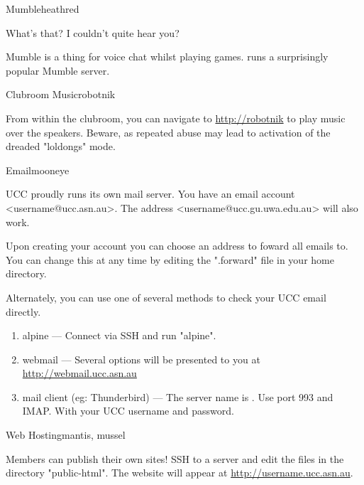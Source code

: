 \begin{uccservice}{Mumble}{heathred}

What's that? I couldn't quite hear you?

Mumble is a thing for voice chat whilst playing games.  runs a surprisingly popular Mumble server.

\end{uccservice}

\begin{uccservice}{Clubroom Music}{robotnik}

From within the clubroom, you can navigate to \url{http://robotnik} to play music over the speakers. Beware, as repeated abuse may lead to activation of the dreaded "loldongs" mode.

\end{uccservice}
\pagebreak
\begin{uccservice}{Email}{mooneye}

UCC proudly runs its own mail server. You have an email account <username@ucc.asn.au>. The address <username@ucc.gu.uwa.edu.au> will also work.

Upon creating your account you can choose an address to foward all emails to. You can change this at any time by editing the ".forward" file in your home directory.

Alternately, you can use one of several methods to check your UCC email directly.
\begin{enumerate}
	\item alpine --- Connect via SSH and run "alpine".
	\item webmail --- Several options will be presented to you at \url{http://webmail.ucc.asn.au}
	\item mail client (eg: Thunderbird) --- The server name is . Use port 993 and IMAP. With your UCC username and password.
\end{enumerate}

\end{uccservice}

\begin{uccservice}{Web Hosting}{mantis, mussel}

Members can publish their own sites! SSH to a server and edit the files in the directory "public-html". The website will appear at \url{http://username.ucc.asn.au}.

\end{uccservice}

\pagebreak

